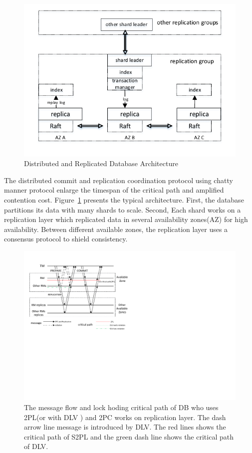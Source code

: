 \documentclass[conference]{IEEEtran}
\begin{document}
\begin{figure}[htbp]
  \centerline{\includegraphics[scale=0.8]{figure/architecture.pdf}}
  \caption{Distributed and Replicated Database Architecture}
  \label{fig:architecture}
\end{figure}
The distributed commit and replication coordination protocol using chatty manner protocol enlarge the timespan of the critical path and amplified contention cost.
Figure~\ref{fig:architecture} presents the typical architecture.
First, the database partitions its data with many shards to scale.
Second, Each shard works on a replication layer which replicated data in several availability zones(AZ)\cite{Aurora:conf/sigmod/VerbitskiGSCGBM18} for high availability.
Between different available zones, the replication layer uses a consensus protocol to shield consistency.
\begin{figure}[htbp]
  \centerline{\includegraphics[scale=0.62]{figure/message_flow.pdf}}
  \caption{The message flow and lock hoding critical path of DB who uses 2PL(or with DLV ) and 2PC works on replication layer. 
The dash arrow line message is introduced by DLV. The red lines shows the critical path of S2PL and the green dash line shows the critical path of DLV.
  }
  \label{fig:two_layers_architecture}
\end{figure}
\end{document}
